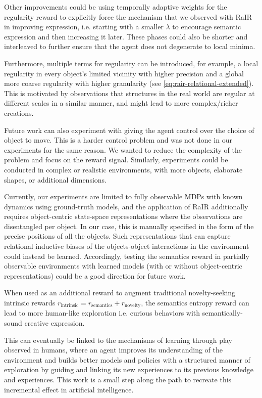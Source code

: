 Other improvements could be using temporally adaptive weights for the regularity reward to explicitly force the mechanism that we observed with RaIR in improving expression, i.e. starting with a smaller \(\lambda\) to encourage semantic expression and then increasing it later.
These phases could also be shorter and interleaved to further ensure that the agent does not degenerate to local minima.

Furthermore, multiple terms for regularity can be introduced, for example, a local regularity in every object's limited vicinity with higher precision and a global more coarse regularity with higher granularity (see \eqref{eq:rair-relational-extended}).
This is motivated by observations that structures in the real world are regular at different scales in a similar manner, and might lead to more complex/richer creations.

Future work can also experiment with giving the agent control over the choice of object to move.
This is a harder control problem and was not done in our experiments for the same reason.
We wanted to reduce the complexity of the problem and focus on the reward signal.
Similarly, experiments could be conducted in complex or realistic environments, with more objects, elaborate shapes, or additional dimensions.

Currently, our experiments are limited to fully observable MDPs with known dynamics using ground-truth models, and the application of RaIR additionally requires object-centric state-space representations where the observations are disentangled per object.
In our case, this is manually specified in the form of the precise positions of all the objects.
Such representations that can capture relational inductive biases of the objects-object interactions in the environment could instead be learned.
Accordingly, testing the semantics reward in partially observable environments with learned models (with or without object-centric representations) could be a good direction for future work.



When used as an additional reward to augment traditional novelty-seeking intrinsic rewards \(r_{\text{intrinsic}} = r_{\text{semantics}} + r_{\text{novelty}}\), the semantics entropy reward can lead to more human-like exploration i.e. curious behaviors with semantically-sound creative expression.

This can eventually be linked to the mechanisms of learning through play observed in humans, where an agent improves its understanding of the environment and builds better models and policies with a structured manner of exploration by guiding and linking its new experiences to its previous knowledge and experiences.
This work is a small step along the path to recreate this incremental effect in artificial intelligence.
